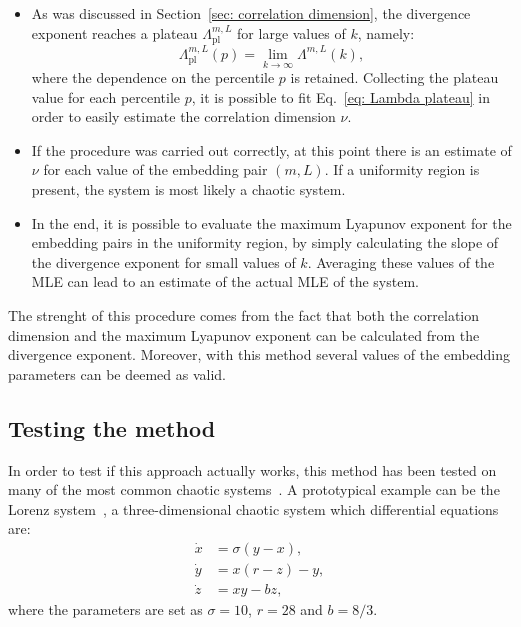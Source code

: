 \begin{itemize}
\item
As was discussed in Section~\ref{sec: correlation dimension}, the divergence exponent reaches a plateau
$\Lambda_{\text{pl}}^{m,L}$ for large values of $k$, namely:
\begin{equation}
    \label{eq: Lambda plateau k infinity}
    \Lambda_{\text{pl}}^{m,L}(p) = \lim_{k\rightarrow \infty}\Lambda^{m,L}(k),
\end{equation}
where the dependence on the percentile $p$ is retained.
Collecting the plateau value for each percentile $p$, it is possible to fit Eq.~\ref{eq: Lambda plateau}
in order to easily estimate the correlation dimension $\nu$.


\item
If the procedure was carried out correctly, at this point there is an estimate of $\nu$ for each
value of the embedding pair $(m,L)$. If a uniformity region is present, the system is most likely
a chaotic system.


\item
In the end, it is possible to evaluate the
maximum Lyapunov exponent for the embedding pairs in the uniformity region, by simply calculating
the slope of the divergence exponent for small values of $k$. Averaging these values of the MLE
can lead to an estimate of the actual MLE of the system.

\end{itemize}

The strenght of this procedure comes from the fact that both the correlation dimension and the
maximum Lyapunov exponent can be calculated from the divergence exponent.
Moreover, with this method several
values of the embedding parameters can be deemed as valid.


\subsection{Testing the method}\label{subsec: testing the procedure}

In order to test if this approach actually works, this method has been tested on many of the most
common chaotic systems~\cite{ref:perinelli2020chasing}. 
A prototypical example can be the Lorenz system~\cite{lorenz1963deterministic}, a three-dimensional
chaotic system which differential equations are:
\begin{equation}
\label{eq: Lorenz system}
\begin{aligned}
    \dot{x}&=\sigma(y-x),\\
    \dot{y}&=x(r-z)-y,\\
    \dot{z}&=xy-bz,
\end{aligned}
\end{equation}
where the parameters are set as $\sigma=10$, $r=28$ and $b=8/3$.

